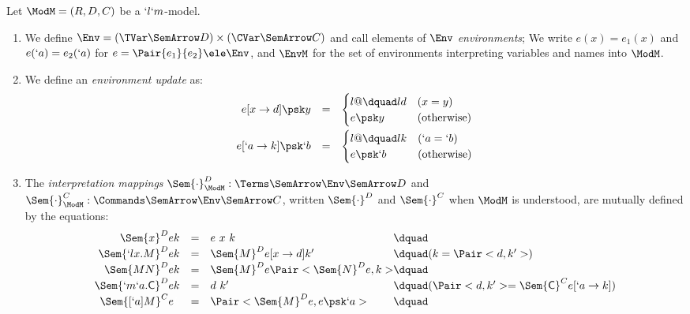 \documentclass{CSML}
\begin{document}
 \begin{defi} \label{def:interpretation} 
Let ${\ModM}=(R,D,C)$ be a $ `l`m$-model.

 \begin{enumerate}

 \item
We define $\Env = (\TVar \SemArrow D) \times (\CVar \SemArrow C)$ and call elements of $\Env$ \emph{environments}; 
We write $e(x) = e_1(x)$ and $e(`a) = e_2(`a)$ for $e = \Pair{e_1}{e_2} \ele \Env$, and $\EnvM$ for the set of environments interpreting variables and names into $\ModM$.

 \item
We define an \emph{environment update} as: 
%
 \[ \begin{array}{rcl}
e [x\to d] \psk y & = & 
 \begin{cases}{l@{\dquad}l}
d & (x = y) \\
e \psk y & (\textrm{otherwise})
 \end{cases}
 \\ [4mm]
e [`a\to k] \psk `b & = & 
 \begin{cases}{l@{\dquad}l}
k & (`a = `b) \\
e \psk `b & (\textrm{otherwise})
 \end{cases}
 \end{array} \]

 \item
The \emph{interpretation mappings}
$ \Sem{ \cdot}_{\ModM}^{D }: \Terms \SemArrow \Env \SemArrow D$ and
$ \Sem{ \cdot}_{\ModM}^{C}: \Commands \SemArrow \Env \SemArrow C$, written $\Sem{ \cdot}^D$ and $\Sem{ \cdot}^C$ when $\ModM$ is understood, are mutually defined by the equations:
%
 \[ \def\arraystretch{1.2} \begin{array}{rcl@{\dquad}l}
 \Sem{ x}^D{ e }{ k }
	&=& e ~ x ~ k \\
 \Sem{ `lx.M}^D{ e }{ k }
	&=& \Sem{ M }^D{ e[x \to d] }{ k' } & (k = \Pair<d,k'>) \\
 \Sem{ MN }^D { e }{ k }
	&=& \Sem{ M }^D{ e }{ \Pair<\Sem{ N }^D { e } , k > } \\
 \Sem{ `m`a.\Cmd}^D{ e }{ k }
	&=& d ~ k' & (\Pair<d , k'> = \Sem{ \Cmd}^C{ e[`a \to k]}) \\
 \Sem{ [`a]M}^C{ e }{ \textcolor{white}{ k }}
	&=& \Pair<\Sem{ M }^D { e } , e \psk `a >
 \end{array} \]

 \end{enumerate}
 \end{defi}\medskip
\end{document}
